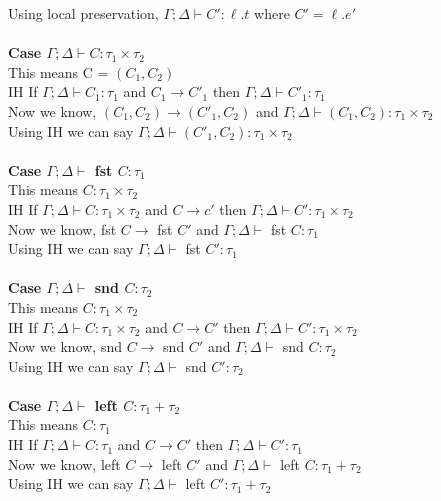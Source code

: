 \documentclass{article}
\begin{document}
Using local preservation, $\Gamma;\Delta \vdash C' : \ell.t$ where $C' = \ell.e'$
\\ \\
\textbf{Case $\Gamma;\Delta \vdash C : \tau_1  \times  \tau_2$ } \\
This means C = $(C_1, C_2)$ \\
IH If $\Gamma; \Delta \vdash C_1 : \tau_1$ and  $C_1 \to C'_1$ then $\Gamma;\Delta \vdash C'_1 : \tau_1$ \\
Now we know, $(C_1,C_2) \to (C'_1, C_2)$ and $\Gamma; \Delta \vdash (C_1, C_2) : \tau_1 \times \tau_2$ \\
Using IH we can say $\Gamma;\Delta \vdash (C'_1, C_2) : \tau_1 \times  \tau_2$ \\\\
\textbf{Case $\Gamma; \Delta\vdash$ fst $C : \tau_1$ } \\
This means $C : \tau_1 \times \tau_2$ \\
IH If $\Gamma; \Delta \vdash C : \tau_1 \times \tau_2$ and  $C \to c'$ then $\Gamma; \Delta \vdash C' : \tau_1 \times \tau_2$ \\
Now we know, fst $C \to$ fst $C'$ and $\Gamma;\Delta \vdash$ fst $C : \tau_1$ \\
Using IH we can say $\Gamma; \Delta \vdash$ fst $ C' : \tau_1$ \\\\
\textbf{Case $\Gamma; \Delta \vdash$ snd $C : \tau_2$ } \\
This means $C : \tau_1 \times \tau_2$ \\
IH If $\Gamma; \Delta \vdash C : \tau_1 \times \tau_2$ and  $C \to C'$ then $\Gamma; \Delta \vdash C' : \tau_1 \times \tau_2$ \\
Now we know, snd $C \to$ snd $C'$ and $\Gamma; \Delta \vdash$ snd $C : \tau_2$ \\
Using IH we can say $\Gamma; \Delta \vdash$ snd $ C' : \tau_2$ \\\\
\textbf{Case $\Gamma; \Delta \vdash$ left $C : \tau_1+\tau_2$ } \\
This means $C : \tau_1$ \\
IH If $\Gamma; \Delta \vdash C : \tau_1$ and  $C \to C'$ then $\Gamma;\Delta \vdash C' : \tau_1$ \\
Now we know, left $C \to$ left $C'$ and $\Gamma; \Delta \vdash$ left $C : \tau_1+\tau_2$ \\
Using IH we can say $\Gamma; \Delta \vdash$ left $ C' : \tau_1+\tau_2$ \\\\
\end{document}

